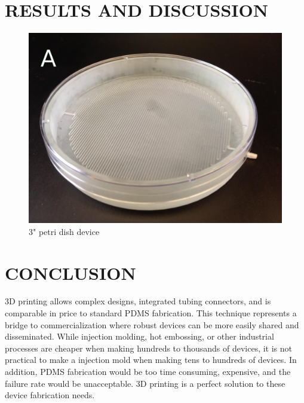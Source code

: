 \documentclass{article}
\begin{document}
\section{RESULTS AND DISCUSSION}



\begin{figure}[h!]
\centering
\includegraphics[scale=1.7]{3-inch-well-photo.png}
\caption{3" petri dish device}
\label{fig:3-inch-well-photo}
\end{figure}

\section{CONCLUSION}

3D printing allows complex designs, integrated tubing connectors, and is comparable in price to standard PDMS fabrication. This technique represents a bridge to commercialization where robust devices can be more easily shared and disseminated. While injection molding, hot embossing, or other industrial processes are cheaper when making hundreds to thousands of devices, it is not practical to make a injection mold when making tens to hundreds of devices. In addition, PDMS fabrication would be too time consuming, expensive, and the failure rate would be unacceptable. 3D printing is a perfect solution to these device fabrication needs.



\end{document}
